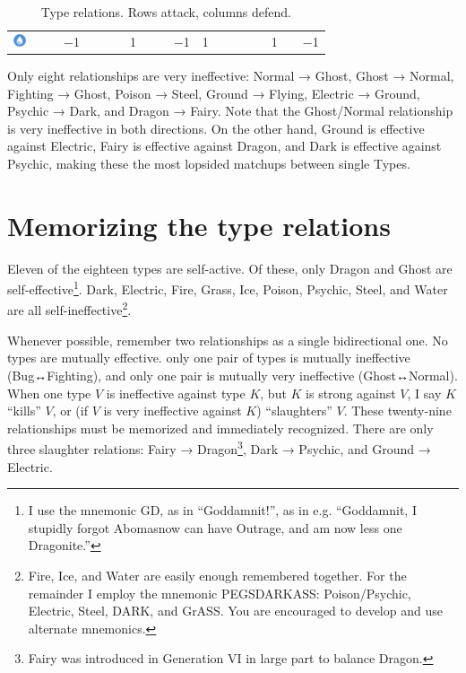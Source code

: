\begin{table}[ht]
\begin{center}
\begin{tabular}{c g c g c g c g c g c g c g c g c g c}
    \includegraphics[width=1em]{images/water.png} & & & −1 & & & & 1 & & & −1 & 1 & & & & & 1 & & −1 \\ %
\end{tabular}
    \caption[Type relations]{Type relations. Rows attack, columns defend.}
\end{center}
\end{table}

Only eight relationships are very ineffective:
Normal → Ghost,
Ghost → Normal,
Fighting → Ghost,
Poison → Steel,
Ground → Flying,
Electric → Ground,
Psychic → Dark,
and Dragon → Fairy.
Note that the Ghost/Normal relationship is very ineffective in both directions.
On the other hand, Ground is effective against Electric, Fairy is effective
 against Dragon, and Dark is effective against Psychic, making these the most
 lopsided matchups between single Types.

\section{Memorizing the type relations}
Eleven of the eighteen types are self-active.
Of these, only Dragon and Ghost are
  self-effective\footnote{I use the mnemonic GD, as in ``Goddamnit!'', as in e.g.
  ``Goddamnit, I stupidly forgot Abomasnow can have Outrage, and am now less one Dragonite.''}.
Dark, Electric, Fire, Grass, Ice, Poison, Psychic,
 Steel, and Water are all self-ineffective\footnote{
Fire, Ice, and Water are easily enough remembered together.
For the remainder I employ the mnemonic PEGSDARKASS\@:
  Poison/Psychic, Electric, Steel, DARK, and GrASS\@.
You are encouraged to develop and use alternate mnemonics.}.

Whenever possible, remember two relationships as a single bidirectional one.
No types are mutually effective.
  only one pair of types is mutually ineffective (Bug↔Fighting),
  and only one pair is mutually very ineffective (Ghost↔Normal).
When one type $V$ is ineffective against type $K$, but $K$ is strong
 against $V$, I say $K$ ``kills'' $V$, or
 (if $V$ is very ineffective against $K$) ``slaughters'' $V$.
These twenty-nine relationships must be memorized and immediately recognized.
There are only three slaughter relations: Fairy → Dragon\footnote{Fairy was
  introduced in Generation VI in large part to balance Dragon.}, Dark → Psychic,
  and Ground → Electric.

